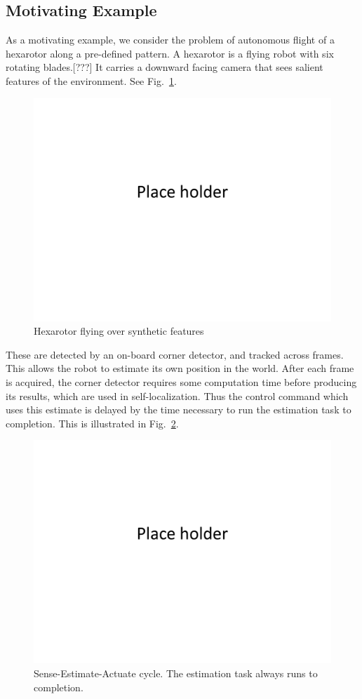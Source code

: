 \subsection{Motivating Example}
\label{motivatingExample}

As a motivating example, we consider the problem of autonomous flight of a hexarotor along a pre-defined pattern.
A hexarotor is a flying robot with six rotating blades.[???]
It carries a downward facing camera that sees salient features of the environment. 
See Fig.~\ref{fig:hexarotor}.
\begin{figure}[t]
	\centering
	\includegraphics[width=0.7\linewidth]{figures/placeHolder}
	\caption{Hexarotor flying over synthetic features}
	\label{fig:hexarotor}
\end{figure}
These are detected by an on-board corner detector, and tracked across frames.
This allows the robot to estimate its own position in the world.
After each frame is acquired, the corner detector requires some computation time before producing its results, which are used in self-localization.
Thus the control command which uses this estimate is delayed by the time necessary to run the estimation task to completion.
This is illustrated in Fig.~\ref{fig:senseActuateDelay}.
\begin{figure}[t]
	\centering
	\includegraphics[width=0.7\linewidth]{figures/placeHolder}
	\caption{Sense-Estimate-Actuate cycle. The estimation task always runs to completion.}
	\label{fig:senseActuateDelay}
\end{figure}
